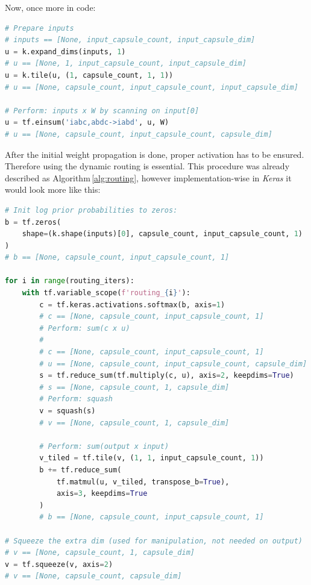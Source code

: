 Now, once more in code:

\begin{lstlisting}[language=Python, caption=Prediction capsule call without routing]
# Prepare inputs
# inputs == [None, input_capsule_count, input_capsule_dim]
u = k.expand_dims(inputs, 1)
# u == [None, 1, input_capsule_count, input_capsule_dim]
u = k.tile(u, (1, capsule_count, 1, 1))
# u == [None, capsule_count, input_capsule_count, input_capsule_dim]

# Perform: inputs x W by scanning on input[0]
u = tf.einsum('iabc,abdc->iabd', u, W)
# u == [None, capsule_count, input_capsule_count, capsule_dim]
\end{lstlisting}

After the initial weight propagation is done, proper activation has to be ensured. Therefore using the dynamic routing is essential. This procedure was already described as Algorithm\,\ref{alg:routing}, however implementation-wise in \textit{Keras} it would look more like this:

\begin{lstlisting}[language=Python, caption=Prediction capsule routing]
# Init log prior probabilities to zeros:
b = tf.zeros(
    shape=(k.shape(inputs)[0], capsule_count, input_capsule_count, 1)
)
# b == [None, capsule_count, input_capsule_count, 1]

for i in range(routing_iters):
    with tf.variable_scope(f'routing_{i}'):
        c = tf.keras.activations.softmax(b, axis=1)
        # c == [None, capsule_count, input_capsule_count, 1]
        # Perform: sum(c x u)
        #
        # c == [None, capsule_count, input_capsule_count, 1]
        # u == [None, capsule_count, input_capsule_count, capsule_dim]
        s = tf.reduce_sum(tf.multiply(c, u), axis=2, keepdims=True)
        # s == [None, capsule_count, 1, capsule_dim]
        # Perform: squash
        v = squash(s)
        # v == [None, capsule_count, 1, capsule_dim]

        # Perform: sum(output x input)
        v_tiled = tf.tile(v, (1, 1, input_capsule_count, 1))
        b += tf.reduce_sum(
            tf.matmul(u, v_tiled, transpose_b=True),
            axis=3, keepdims=True
        )
        # b == [None, capsule_count, input_capsule_count, 1]

# Squeeze the extra dim (used for manipulation, not needed on output)
# v == [None, capsule_count, 1, capsule_dim]
v = tf.squeeze(v, axis=2)
# v == [None, capsule_count, capsule_dim]
\end{lstlisting}

